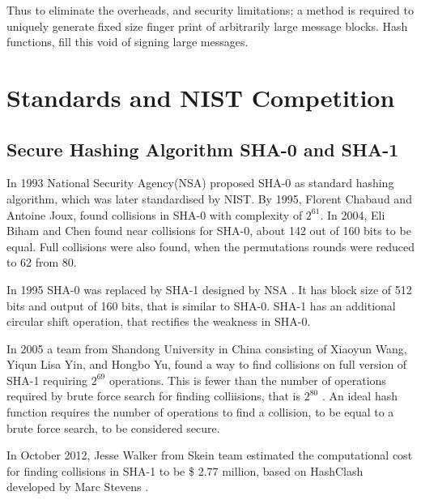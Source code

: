 Thus to eliminate the overheads, and security limitations; a method is required to uniquely generate fixed
size finger print of arbitrarily large message blocks. Hash functions, fill this void of signing large messages.

\section{Standards and NIST Competition} 

  \subsection{Secure Hashing Algorithm SHA-0 and SHA-1}

  In 1993 National Security Agency(NSA) proposed SHA-0 as standard hashing algorithm, which was later
  standardised by NIST. By 1995, Florent Chabaud and Antoine Joux, found collisions in SHA-0 
  with complexity of $2^{61}$. In 2004, Eli Biham and Chen found near collisions for SHA-0, about 142 
  out of 160 bits to be equal. Full  collisions were also found, when the permutations rounds were reduced 
  to 62 from 80.

  In 1995 SHA-0 was replaced by SHA-1 designed by NSA \cite{00006, 00007}. It has block size of 512 bits
  and output of 160 bits, that is similar to SHA-0. SHA-1 has an additional circular shift operation, 
  that rectifies the weakness in SHA-0.

  In 2005 a team from Shandong University in China consisting of Xiaoyun Wang, Yiqun Lisa Yin, 
  and Hongbo Yu, found a way to find collisions on full version of SHA-1 requiring $2^{69}$ operations. 
  This is fewer than the number of operations required by brute force search for finding colliisions, that
  is $2^{80}$ \cite{00010}. An ideal hash function requires the number of operations to find a collision, 
  to be equal to a brute force search, to be considered secure. 

  In October 2012, Jesse Walker from Skein team estimated the computational cost for finding collisions 
  in SHA-1 to be \$ 2.77 million, based on HashClash developed by Marc Stevens \cite{00008}.

